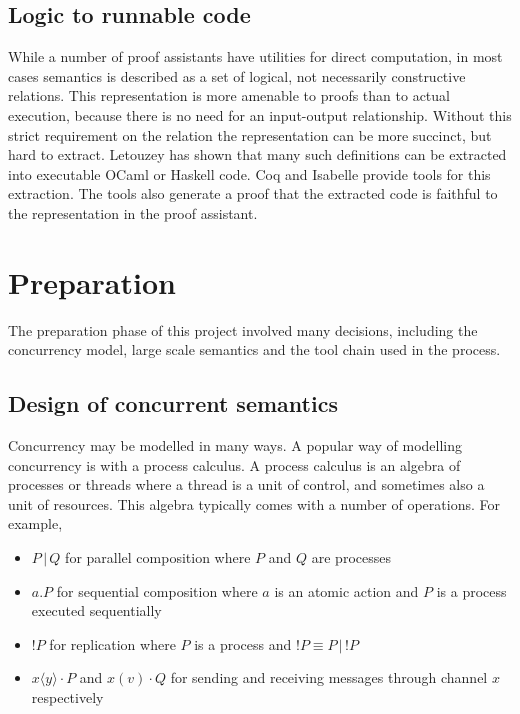 \documentclass[12pt,twoside,notitlepage]{report}
\theoremstyle{plain}%
\theoremstyle{definition}
\theoremstyle{remark}
\begin{document}
\section{Logic to runnable code}
While a number of proof assistants have utilities for direct computation, in most cases semantics is described as a set of logical, not necessarily constructive relations. This representation is more amenable to proofs than to actual execution, because there is no need for an input-output relationship. Without this strict requirement on the relation the representation can be more succinct, but hard to extract. Letouzey\cite{letouzey2008extraction} has shown that many such definitions can be extracted into executable OCaml or Haskell code.  Coq and Isabelle provide tools for this extraction. The tools also generate a proof that the extracted code is faithful to the representation in the proof assistant.


\chapter{Preparation}
The preparation phase of this project involved many decisions, including the concurrency model, large scale semantics and the tool chain used in the process.

\section{Design of concurrent semantics}
Concurrency may be modelled in many ways. A popular way of modelling concurrency is with a process calculus. A process calculus is an algebra of processes or threads where a thread is a unit of control, and sometimes also a unit of resources. This algebra typically comes with a number of operations.  For example, 
\begin{itemize}
\item{$ P\, | \, Q $  for parallel composition where $ P $ and $ Q $ are processes}
\item{ $ a.P  $ for sequential composition where $ a $ is an atomic action and $ P $ is a process executed sequentially}
\item{$ !P $ for replication where $ P $ is a process and $ !P \equiv P \, | \, !P $}
\item{$ x\langle y \rangle \cdot P $ and $ x(v) \cdot Q $ for sending and receiving messages through channel $ x $ respectively} 
\end{itemize}
\end{document}
